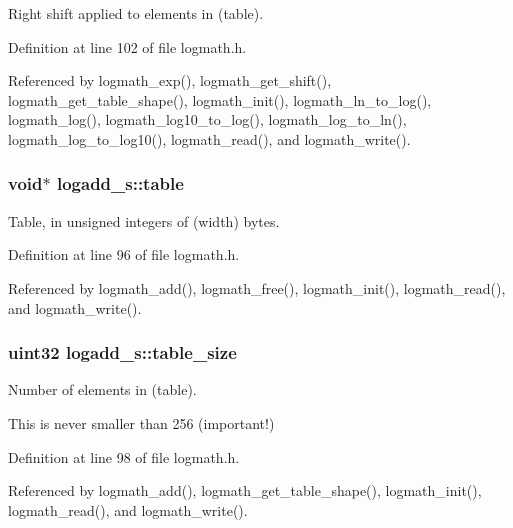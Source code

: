 Right shift applied to elements in (table). 



Definition at line 102 of file logmath.\+h.



Referenced by logmath\+\_\+exp(), logmath\+\_\+get\+\_\+shift(), logmath\+\_\+get\+\_\+table\+\_\+shape(), logmath\+\_\+init(), logmath\+\_\+ln\+\_\+to\+\_\+log(), logmath\+\_\+log(), logmath\+\_\+log10\+\_\+to\+\_\+log(), logmath\+\_\+log\+\_\+to\+\_\+ln(), logmath\+\_\+log\+\_\+to\+\_\+log10(), logmath\+\_\+read(), and logmath\+\_\+write().

\subsubsection[{table}]{\setlength{\rightskip}{0pt plus 5cm}void$\ast$ logadd\+\_\+s\+::table}\label{structlogadd__s_a27793577d513d85cd73c2daffc140695}


Table, in unsigned integers of (width) bytes. 



Definition at line 96 of file logmath.\+h.



Referenced by logmath\+\_\+add(), logmath\+\_\+free(), logmath\+\_\+init(), logmath\+\_\+read(), and logmath\+\_\+write().

\subsubsection[{table\+\_\+size}]{\setlength{\rightskip}{0pt plus 5cm}uint32 logadd\+\_\+s\+::table\+\_\+size}\label{structlogadd__s_a484c53a05b46d863d0456af679cee5d8}


Number of elements in (table). 

This is never smaller than 256 (important!) 

Definition at line 98 of file logmath.\+h.



Referenced by logmath\+\_\+add(), logmath\+\_\+get\+\_\+table\+\_\+shape(), logmath\+\_\+init(), logmath\+\_\+read(), and logmath\+\_\+write().

